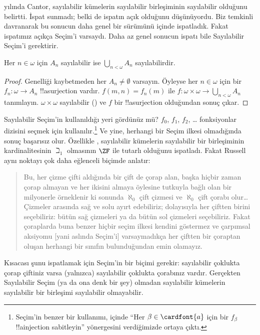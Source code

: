 \begin{ex}
\citeyear{Cantor1878} yılında Cantor, sayılabilir kümelerin sayılabilir
birleşiminin sayılabilir olduğunu belirtti. İspat sunmadı; belki de ispatın
açık olduğunu düşünüyordu. Biz temkinli davranarak bu sonucun daha genel
bir sürümünü  içinde
ispatladık. Fakat ispatımız açıkça Seçim'i varsaydı. Daha az genel sonucun
ispatı bile Sayılabilir Seçim'i gerektirir.

\begin{thm}
Her $n\in\omega$ için $A_n$ sayılabilir ise
$\bigcup_{n<\omega}A_n$ sayılabilirdir.
\end{thm}

\begin{proof}
Genelliği kaybetmeden her $A_n\neq\emptyset$ varsayın. Öyleyse her
$n\in\omega$ için bir $f_n\colon\omega\to A_n$ !!a{surjection} vardır.
$f(m,n)=f_n(m)$ ile
$f\colon\omega\times\omega\to\bigcup_{n<\omega}A_n$ tanımlayın.
$\omega\times\omega$ sayılabilir
() ve $f$ bir
!!a{surjection} olduğundan sonuç çıkar.
\end{proof}
\noindent
Sayılabilir Seçim'in kullanıldığı yeri gördünüz mü? $f_0$, $f_1$, $f_2$, \dots
fonksiyonlar dizisini seçmek için kullanılır.\footnote{Seçim'in benzer bir
kullanımı,  içinde
``Her $\beta\in\cardfont{a}$ için bir $f_\beta$ !!a{injection}
sabitleyin'' yönergesini verdiğimizde ortaya çıktı.} Ve yine, herhangi bir
Seçim ilkesi olmadığında sonuç başarısız olur. Özellikle
\citet{FefermanLevy1963}, sayılabilir kümelerin sayılabilir bir birleşiminin
kardinalitesinin $\beth_1$ olmasının $\ZF$ ile tutarlı olduğunu ispatladı.
Fakat Russell aynı noktayı çok daha eğlenceli biçimde anlatır:
\begin{quote}
  Bu, her çizme çifti aldığında bir çift de çorap alan, başka hiçbir zaman
  çorap almayan ve her ikisini almaya öylesine tutkuyla bağlı olan bir
  milyonerle örneklenir ki sonunda $\aleph_0$ çift çizmesi ve $\aleph_0$
  çift çorabı olur\dots\@ Çizmeler arasında sağ ve solu ayırt edebiliriz;
  dolayısıyla her çiftten birini seçebiliriz: bütün sağ çizmeleri ya da
  bütün sol çizmeleri seçebiliriz. Fakat çoraplarda buna benzer hiçbir
  seçim ilkesi kendini göstermez ve çarpımsal aksiyomu [yani aslında
  Seçim'i] varsaymadıkça her çiftten bir çoraptan oluşan herhangi bir
  sınıfın bulunduğundan emin olamayız.
  \citep[p.~126]{Russell1919}
\end{quote}
Kısacası şunu ispatlamak için Seçim'in bir biçimi gerekir: sayılabilir
çoklukta çorap çiftiniz varsa (yalnızca) sayılabilir çoklukta çorabınız
vardır. Gerçekten Sayılabilir Seçim (ya da ona denk bir şey) olmadan
sayılabilir kümelerin sayılabilir bir birleşimi sayılabilir olmayabilir.
\end{ex}


